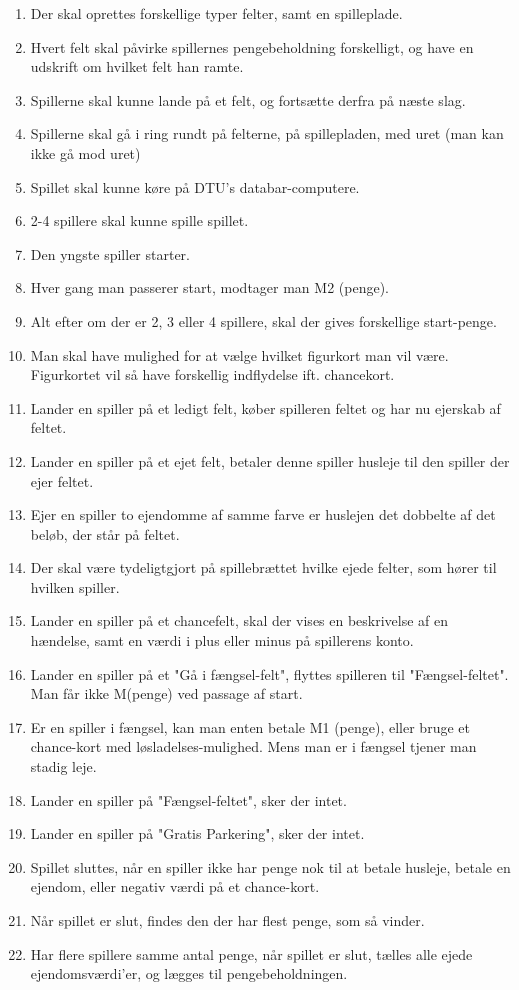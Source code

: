 \begin{enumerate}
\item Der skal oprettes forskellige typer felter, samt en spilleplade.
\item Hvert felt skal påvirke spillernes pengebeholdning forskelligt, og have en udskrift om hvilket felt han ramte.
\item Spillerne skal kunne lande på et felt, og fortsætte derfra på næste slag.
\item Spillerne skal gå i ring rundt på felterne, på spillepladen, med uret (man kan ikke gå mod uret)
\item Spillet skal kunne køre på DTU's databar-computere.
\item 2-4 spillere skal kunne spille spillet.
\item Den yngste spiller starter.
\item Hver gang man passerer start, modtager man M2 (penge).
\item Alt efter om der er 2, 3 eller 4 spillere, skal der gives forskellige start-penge.

\item Man skal have mulighed for at vælge hvilket figurkort man vil være. \\Figurkortet vil så have forskellig indflydelse ift. chancekort.

\item Lander en spiller på et ledigt felt, køber spilleren feltet og har nu ejerskab af feltet.
\item Lander en spiller på et ejet felt, betaler denne spiller husleje til den spiller der ejer feltet.
\item Ejer en spiller to ejendomme af samme farve er huslejen det dobbelte af det beløb, der står på feltet.

\item Der skal være tydeligtgjort på spillebrættet hvilke ejede felter, som hører til hvilken spiller.

\item Lander en spiller på et chancefelt, skal der vises en beskrivelse af en hændelse, samt en værdi i plus eller minus på spillerens konto.
\item Lander en spiller på et "Gå i fængsel-felt", flyttes spilleren til "Fængsel-feltet". Man får ikke M(penge) ved passage af start.

\item Er en spiller i fængsel, kan man enten betale M1 (penge), eller bruge et chance-kort med løsladelses-mulighed. Mens man er i fængsel tjener man stadig leje.
\item Lander en spiller på "Fængsel-feltet", sker der intet.
\item Lander en spiller på "Gratis Parkering", sker der intet.
\item Spillet sluttes, når en spiller ikke har penge nok til at betale husleje, betale en ejendom, eller negativ værdi på et chance-kort.
\item Når spillet er slut, findes den der har flest penge, som så vinder.
\item Har flere spillere samme antal penge, når spillet er slut, tælles alle ejede ejendomsværdi'er, og lægges til pengebeholdningen.


\end{enumerate}
